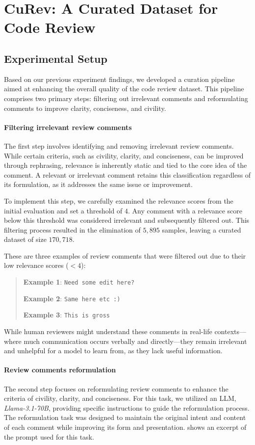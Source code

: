 \section{CuRev: A Curated Dataset for Code Review}
\label{sec:curdata}

\subsection{Experimental Setup}
Based on our previous experiment findings, we developed a curation pipeline aimed at enhancing the overall quality of the code review dataset. This pipeline comprises two primary steps: filtering out irrelevant comments and reformulating comments to improve clarity, conciseness, and civility.


\paragraph*{\textbf{Filtering irrelevant review comments}}
The first step involves identifying and removing irrelevant review comments. While certain criteria, such as civility, clarity, and conciseness, can be improved through rephrasing, relevance is inherently static and tied to the core idea of the comment. A relevant or irrelevant comment retains this classification regardless of its formulation, as it addresses the same issue or improvement.

To implement this step, we carefully examined the relevance scores from the initial evaluation and set a threshold of $4$. Any comment with a relevance score below this threshold was considered irrelevant and subsequently filtered out. This filtering process resulted in the elimination of $5,895$ samples, leaving a curated dataset of size $170,718$.

These are three examples of review comments that were filtered out due to their low relevance scores ($<4$):
\begin{quote}
\textbf{Example 1}: \texttt{Need some edit here?}

\textbf{Example 2}: \texttt{Same here etc :)}

\textbf{Example 3}: \texttt{This is gross}
\end{quote}
While human reviewers might understand these comments in real-life contexts—where much communication occurs verbally and directly—they remain irrelevant and unhelpful for a model to learn from, as they lack useful information.


\paragraph*{\textbf{Review comments reformulation}}
The second step focuses on reformulating review comments to enhance the criteria of civility, clarity, and conciseness. For this task, we utilized an LLM, \emph{Llama-3.1-70B}, providing specific instructions to guide the reformulation process. The reformulation task was designed to maintain the original intent and content of each comment while improving its form and presentation.  shows an excerpt of the prompt used for this task.


